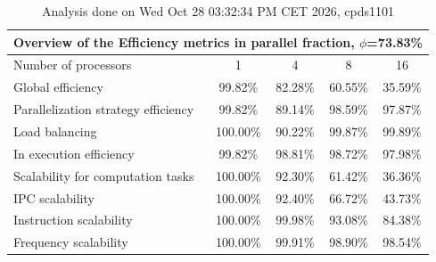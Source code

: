 \begin{table}[h]
\begin{center}
\begin{tabular}{|l|c|c|c|c|}
\hline
\multicolumn{5}{|c|}{Overview of the Efficiency metrics in parallel fraction, $\phi$=73.83\%} \\
\hline
\hline
Number of processors & 1 & 4 & 8 & 16 \\
\hline
\hline
Global efficiency                      &     99.82\% &     82.28\% &     60.55\% &     35.59\% \\
\hline
\hline
Parallelization strategy efficiency &     99.82\% &     89.14\% &     98.59\% &     97.87\% \\
\hline
Load balancing                   &    100.00\% &     90.22\% &     99.87\% &     99.89\% \\
In execution efficiency          &     99.82\% &     98.81\% &     98.72\% &     97.98\% \\
\hline
\hline
Scalability for computation tasks   &    100.00\% &     92.30\% &     61.42\% &     36.36\% \\
\hline
IPC scalability                  &    100.00\% &     92.40\% &     66.72\% &     43.73\% \\
Instruction scalability          &    100.00\% &     99.98\% &     93.08\% &     84.38\% \\
Frequency scalability            &    100.00\% &     99.91\% &     98.90\% &     98.54\% \\
\hline
\end{tabular}
\end{center}
\caption{ Analysis done on Wed Oct 28 03:32:34 PM CET 2026, cpds1101}
\end{table}
